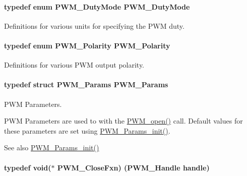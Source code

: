 \paragraph[{P\+W\+M\+\_\+\+Duty\+Mode}]{\setlength{\rightskip}{0pt plus 5cm}typedef enum {\bf P\+W\+M\+\_\+\+Duty\+Mode}  {\bf P\+W\+M\+\_\+\+Duty\+Mode}}\label{_p_w_m_8h_a19cd06b0c3560cfdf4125d1bc70a155e}


Definitions for various units for specifying the P\+W\+M duty. 

\paragraph[{P\+W\+M\+\_\+\+Polarity}]{\setlength{\rightskip}{0pt plus 5cm}typedef enum {\bf P\+W\+M\+\_\+\+Polarity}  {\bf P\+W\+M\+\_\+\+Polarity}}\label{_p_w_m_8h_a15b860dd4dbdba68833b71c4d9f2b929}


Definitions for various P\+W\+M output polarity. 

\paragraph[{P\+W\+M\+\_\+\+Params}]{\setlength{\rightskip}{0pt plus 5cm}typedef struct {\bf P\+W\+M\+\_\+\+Params}  {\bf P\+W\+M\+\_\+\+Params}}\label{_p_w_m_8h_ac7349e4fc779fd744daf79b403269167}


P\+W\+M Parameters. 

P\+W\+M Parameters are used to with the \hyperlink{_p_w_m_8h_ac963beab0c5c6901bf852f175028aeaf}{P\+W\+M\+\_\+open()} call. Default values for these parameters are set using \hyperlink{_p_w_m_8h_acbdd3192f9f06bf689e4a3855926dcac}{P\+W\+M\+\_\+\+Params\+\_\+init()}.

\begin{DoxySeeAlso}{See also}
\hyperlink{_p_w_m_8h_acbdd3192f9f06bf689e4a3855926dcac}{P\+W\+M\+\_\+\+Params\+\_\+init()} 
\end{DoxySeeAlso}
\paragraph[{P\+W\+M\+\_\+\+Close\+Fxn}]{\setlength{\rightskip}{0pt plus 5cm}typedef void($\ast$ P\+W\+M\+\_\+\+Close\+Fxn) ({\bf P\+W\+M\+\_\+\+Handle} handle)}\label{_p_w_m_8h_a1643d365dfa900197b324ea74035d2ec}


